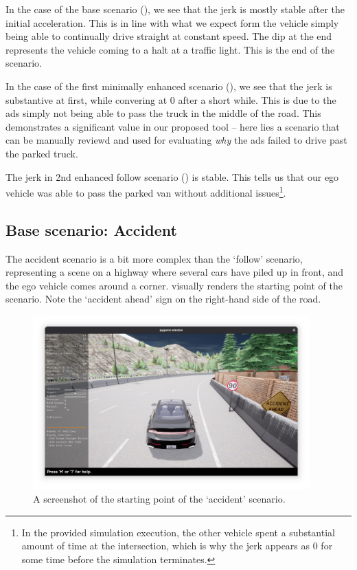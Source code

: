 In the case of the base scenario (), we see that the jerk is mostly stable
after the initial acceleration. This is in line with what we expect form the vehicle simply being
able to continually drive straight at constant speed. The dip at the end represents the vehicle coming to a halt at a traffic light. This is the end of the
scenario.

In the case of the first minimally enhanced scenario (), we
see that the jerk is substantive at first, while convering at \num{0} after a short while. This is
due to the \acrshort{ads} simply not being able to pass the truck in the middle of the road. This
demonstrates a significant value in our proposed tool -- here lies a scenario that can be manually
reviewd and used for evaluating \emph{why} the \acrshort{ads} failed to drive past the parked truck.

The jerk in 2nd enhanced follow scenario () is stable. This
tells us that our ego vehicle was able to pass the parked van without additional issues\footnote{In
    the provided simulation execution, the other vehicle spent a substantial amount of time at the
    intersection, which is why the jerk appears as \num{0} for some time before the simulation
    terminates.}.

\subsection{Base scenario: Accident}\label{chp:resultsAccidentScenario}

The accident scenario is a bit more complex than the `follow' scenario, representing a scene on a
highway where several cars have piled up in front, and the ego vehicle comes around a corner.
 visually renders the starting point of the scenario. Note the
`accident ahead' sign on the right-hand side of the road.

\begin{figure}[htb]
    \centering
    \includegraphics[width=0.95\textwidth]{experiment-material/accident-pics/base/startpoint.png}
    \caption{A screenshot of the starting point of the `accident'
        scenario.}\label{fig:accidentBaseStartPoint}
\end{figure}


